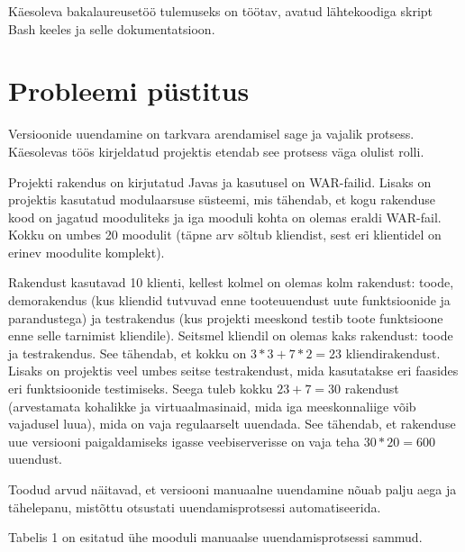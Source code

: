 \documentclass[12pt]{article}
\begin{document}
  Käesoleva bakalaureusetöö tulemuseks on töötav, avatud lähtekoodiga skript Bash keeles ja selle dokumentatsioon.
  
  \newpage
  
  \section{Probleemi püstitus}
  
  Versioonide uuendamine on tarkvara arendamisel sage ja vajalik protsess. Käes\-olevas töös kirjeldatud projektis etendab see protsess väga olulist rolli.
  
  Projekti rakendus on kirjutatud Javas ja kasutusel on WAR\--failid. Lisaks on projektis kasutatud modulaarsuse süsteemi, mis tähendab, et kogu rakenduse kood on jagatud mooduliteks ja iga mooduli kohta on olemas eraldi WAR\--fail. Kokku on umbes 20 moodulit (täpne arv sõltub kliendist, sest eri klientidel on erinev moodulite komplekt).
  
  Rakendust kasutavad 10 klienti, kellest kolmel on olemas kolm rakendust: toode, demorakendus (kus kliendid tutvuvad enne tooteuuendust uute funktsioonide ja parandustega) ja testrakendus (kus projekti meeskond testib toote funktsioone enne selle tarnimist kliendile). Seitsmel kliendil on olemas kaks rakendust: toode ja testrakendus. See tähendab, et kokku on $3*3+7*2=23$ kliendirakendust. Lisaks on projektis veel umbes seitse testrakendust, mida kasutatakse eri faasides eri funktsioonide testimiseks. Seega tuleb kokku $23+7=30$ rakendust (arvestamata kohalikke ja virtuaalmasinaid, mida iga meeskonnaliige võib vajadusel luua), mida on vaja regulaarselt uuendada. See tähendab, et rakenduse uue versiooni paigaldamiseks igasse veebiserverisse on vaja teha $30*20=600$ uuendust.
  
  Toodud arvud näitavad, et versiooni manuaalne uuendamine nõuab palju aega ja tähelepanu, mistõttu otsustati uuendamisprotsessi automatiseerida.
    
  Tabelis 1 on esitatud ühe mooduli manuaalse uuendamisprotsessi sammud.
  
\end{document}
